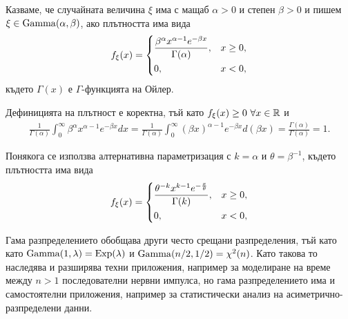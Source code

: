 \documentclass[numbers=endperiod, bibliography=totocnumbered]{scrartcl}
\begin{document}
\begin{definition}
  Казваме, че случайната величина \( \xi \) има  с мащаб \( \alpha > 0 \) и степен \( \beta > 0 \) и пишем \( \xi \in \operatorname{Gamma}(\alpha, \beta) \), ако плътността има вида
  \begin{align*}
    f_\xi(x)
    =
    \begin{dcases}
      \frac {\beta^\alpha x^{\alpha-1} e^{-\beta x}} {\Gamma(\alpha)}, &x \geq 0, \\
      0, &x < 0,
    \end{dcases}
  \end{align*}
  където \( \Gamma(x) \) е \( \Gamma \)-функцията на Ойлер.

  Дефиницията на плътност е коректна, тъй като \( f_\xi(x) \geq 0~\forall x \in \mathbb{R} \) и
  \begin{align*}
    \frac 1 {\Gamma(\alpha)} \int_0^\infty {\beta^\alpha x^{\alpha-1} e^{-\beta x}} dx
    =
    \frac 1 {\Gamma(\alpha)} \int_0^\infty {{(\beta x)}^{\alpha-1} e^{-\beta x}} d(\beta x)
    =
    \frac {\Gamma(\alpha)} {\Gamma(\alpha)}
    =
    1.
  \end{align*}

  Понякога се използва алтернативна параметризация с \( k = \alpha \) и \( \theta = \beta^{-1} \), където плътността има вида
  \begin{align*}
    f_\xi(x)
    =
    \begin{dcases}
      \frac {\theta^{-k} x^{k-1} e^{-\frac x \theta}} {\Gamma(k)}, &x \geq 0, \\
      0, &x < 0,
    \end{dcases}
  \end{align*}
\end{definition}

Гама разпределението обобщава други често срещани разпределения, тъй като като \( \operatorname{Gamma}(1, \lambda) = \operatorname{Exp}(\lambda) \) и \( \operatorname{Gamma}(n/2, 1/2) = \operatorname{\chi^2}(n) \). Като такова то наследява и разширява техни приложения, например за моделиране на време между \( n > 1 \) последователни нервни импулса, но гама разпределението има и самостоятелни приложения, например за статистически анализ на асиметрично-разпределени данни.
\end{document}
